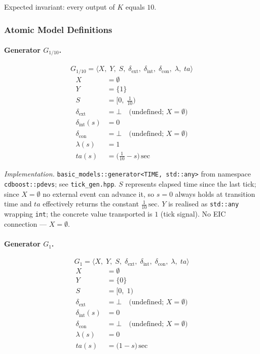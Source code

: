 Expected invariant: every output of $K$ equals $10$.

\subsubsection*{Atomic Model Definitions}

\paragraph{Generator $G_{1/10}$.}

\[
  G_{1/10} = \langle X,\; Y,\; S,\;
               \delta_{\text{ext}},\; \delta_{\text{int}},\; \delta_{\text{con}},\;
               \lambda,\; ta \rangle
\]
\begin{align*}
  X &= \emptyset \\
  Y &= \{1\} \\
  S &= \bigl[0,\;\tfrac{1}{10}\bigr) \\
  \delta_{\text{ext}} &= \bot
    \quad\text{(undefined; } X = \emptyset\text{)} \\
  \delta_{\text{int}}(s) &= 0 \\
  \delta_{\text{con}} &= \bot
    \quad\text{(undefined; } X = \emptyset\text{)} \\
  \lambda(s) &= 1 \\
  ta(s) &= \bigl(\tfrac{1}{10} - s\bigr)\,\text{sec}
\end{align*}

\noindent\textit{Implementation.}
\texttt{basic\_models::generator<TIME,\,std::any>}
from namespace \texttt{cdboost::pdevs}; see \texttt{tick\_gen.hpp}.
$S$ represents elapsed time since the last tick; since $X = \emptyset$
no external event can advance it, so $s = 0$ always holds at
transition time and $ta$ effectively returns the constant
$\tfrac{1}{10}\,\text{sec}$.
$Y$ is realised as \texttt{std::any} wrapping \texttt{int};
the concrete value transported is $1$ (tick signal).
No EIC connection --- $X = \emptyset$.

\paragraph{Generator $G_1$.}

\[
  G_1 = \langle X,\; Y,\; S,\;
          \delta_{\text{ext}},\; \delta_{\text{int}},\; \delta_{\text{con}},\;
          \lambda,\; ta \rangle
\]
\begin{align*}
  X &= \emptyset \\
  Y &= \{0\} \\
  S &= \bigl[0,\; 1\bigr) \\
  \delta_{\text{ext}} &= \bot
    \quad\text{(undefined; } X = \emptyset\text{)} \\
  \delta_{\text{int}}(s) &= 0 \\
  \delta_{\text{con}} &= \bot
    \quad\text{(undefined; } X = \emptyset\text{)} \\
  \lambda(s) &= 0 \\
  ta(s) &= \bigl(1 - s\bigr)\,\text{sec}
\end{align*}

